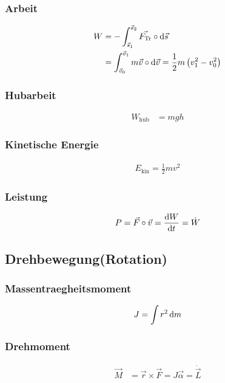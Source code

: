 \begin{multicols}{2}{}
\subsubsection{Arbeit}
\begin{align*}
W&=-\int_{\vec{s}_1}^{\vec{s}_2}\vec{F_{\text{Tr}}}\circ\mathop{}\!\mathrm{d} \vec{s}\\
&=\int_{\vec{v}_0}^{\vec{v}_1}m\vec{v}\circ\mathop{}\!\mathrm{d} \vec{v}=\frac{1}{2}m\left(v_1^2-v_0^2\right) 
\end{align*}

\subsubsection{Hubarbeit}
\begin{align*}
W_{\text{hub}}&=mgh
\end{align*}
\end{multicols}

\begin{multicols}{2}{}
\subsubsection{Kinetische Energie}
\begin{align*}
E_{\text{kin}}=\frac{1}{2}mv^2
\end{align*}

\subsubsection{Leistung}
\begin{align*}
P=\vec{F}\circ\vec{v}=\frac{\mathop{}\!\mathrm{d} W}{\mathop{}\!\mathrm{d} t}=\dot{W}
\end{align*}
\end{multicols}


\subsection{Drehbewegung(Rotation)}

\begin{multicols}{2}{}
\subsubsection{Massentraegheitsmoment}
\begin{align*}
J=\int r^2 \mathop{}\!\mathrm{d} m
\end{align*}

\subsubsection{Drehmoment}
\begin{align*}
\vec{M}&=\vec{r}\times\vec{F}=J\vec{\alpha}=\dot{\vec{L}}
\end{align*}
\end{multicols}

